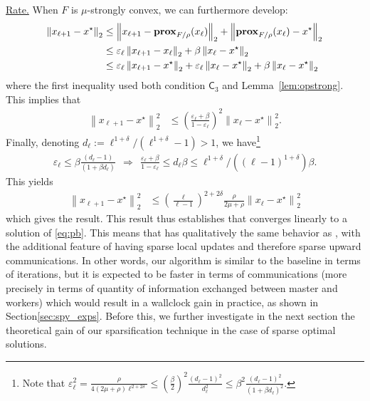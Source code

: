 \vspace*{1ex}
\noindent\underline{Rate.} When $F$ is $\mu$-strongly convex, we can furthermore develop:
\begin{align*}
    \left\| x_{\ell+1} - x^\star \right\|_2 &\leq \left\| x_{\ell+1} - \mathbf{prox}_{F/\rho}(x_\ell) \right\|_2 + \left\|\mathbf{prox}_{F/\rho}(x_\ell) - x^\star \right\|_2 \\
    &\leq \varepsilon_\ell \left\| x_{\ell+1} - x_\ell \right\|_2 + \beta \left\|x_\ell - x^\star \right\|_2 \\
    &\leq  \varepsilon_\ell \left\| x_{\ell+1} - x^\star \right\|_2  + \varepsilon_\ell \left\| x_{\ell} - x^\star \right\|_2 + \beta \left\|x_\ell - x^\star \right\|_2
\end{align*}
where the first inequality used both condition $\mathsf{C}_3$ and Lemma~\ref{lem:opstrong}. This implies that 
\begin{align*}
    \left\| x_{\ell+1} - x^\star \right\|^2_2 &\leq \left( \frac{\varepsilon_\ell + \beta}{1 - \varepsilon_\ell} \right)^2  \left\|x_\ell - x^\star \right\|^2_2.
\end{align*}
Finally, denoting $d_\ell := \ell^{1+\delta}/(\ell^{1+\delta}-1) > 1 $, we have\footnote{Note that $
   \varepsilon_\ell^2 = \frac{\rho}{4(2\mu+\rho) \ell^{2+2\delta}} \leq \left( \frac{\beta}{2} \right)^2 \frac{(d_\ell-1)^2}{d_\ell^2} \leq \beta^2 \frac{(d_\ell-1)^2}{(1+\beta d_\ell)^2} $.}
\begin{align*}
    \varepsilon_\ell \leq \beta \frac{(d_\ell-1)}{(1+\beta d_\ell)} ~~\Longrightarrow~~ \frac{\varepsilon_\ell + \beta}{1 - \varepsilon_\ell} \leq d_\ell \beta \leq \ell^{1+\delta}/((\ell-1)^{1+\delta}) \beta.
\end{align*}
This yields
\begin{align*}
    \left\| x_{\ell+1} - x^\star \right\|^2_2 &\leq \left( \frac{\ell}{\ell-1} \right)^{2+2\delta} \frac{{\rho }}{2\mu + {\rho }} \left\|x_\ell - x^\star \right\|^2_2 
\end{align*}
which gives the result.
This result thus establishes that \recoalgo converges linearly to a solution of \eqref{eq:pb}. This means that \recoalgo has qualitatively the same behavior as \dave, with the additional feature of having sparse local updates and therefore sparse upward communications. In other words, our algorithm is similar to the baseline in terms of iterations, but it is expected to be faster in terms of communications (more precisely in terms of quantity of information exchanged between master and workers) which would result in a wallclock gain in practice, as shown in Section\;\ref{sec:spy_exps}. Before this, we further investigate in the next section the theoretical gain of our sparsification technique in the case of sparse optimal solutions.


